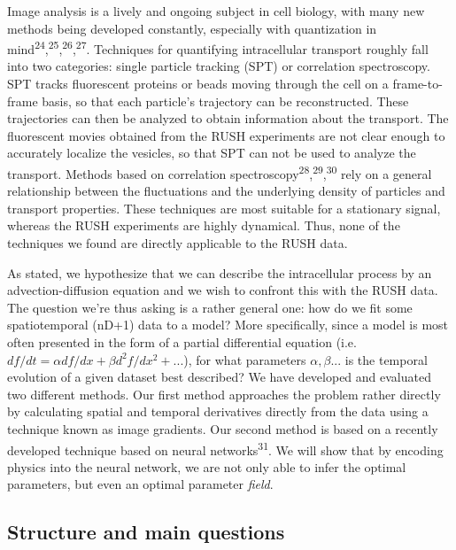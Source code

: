 \documentclass{Dissertate}
\begin{document}
Image analysis is a lively and ongoing subject in cell biology, with
many new methods being developed constantly, especially with
quantization in
mind\textsuperscript{24},\textsuperscript{25},\textsuperscript{26},\textsuperscript{27}.
Techniques for quantifying intracellular transport roughly fall into two
categories: single particle tracking (SPT) or correlation spectroscopy.
SPT tracks fluorescent proteins or beads moving through the cell on a
frame-to-frame basis, so that each particle's trajectory can be
reconstructed. These trajectories can then be analyzed to obtain
information about the transport. The fluorescent movies obtained from
the RUSH experiments are not clear enough to accurately localize the
vesicles, so that SPT can not be used to analyze the transport. Methods
based on correlation
spectroscopy\textsuperscript{28},\textsuperscript{29},\textsuperscript{30}
rely on a general relationship between the fluctuations and the
underlying density of particles and transport properties. These
techniques are most suitable for a stationary signal, whereas the RUSH
experiments are highly dynamical. Thus, none of the techniques we found
are directly applicable to the RUSH data.

As stated, we hypothesize that we can describe the intracellular process
by an advection-diffusion equation and we wish to confront this with the
RUSH data. The question we're thus asking is a rather general one: how
do we fit some spatiotemporal (nD+1) data to a model? More specifically,
since a model is most often presented in the form of a partial
differential equation (i.e.
\(df/dt = \alpha df/dx+\beta d^2f/dx^2+...\)), for what parameters
\(\alpha, \beta...\) is the temporal evolution of a given dataset best
described? We have developed and evaluated two different methods. Our
first method approaches the problem rather directly by calculating
spatial and temporal derivatives directly from the data using a
technique known as image gradients. Our second method is based on a
recently developed technique based on neural
networks\textsuperscript{31}. We will show that by encoding physics into
the neural network, we are not only able to infer the optimal
parameters, but even an optimal parameter \emph{field}.

\hypertarget{structure-and-main-questions}{%
\subsection{Structure and main
questions}\label{structure-and-main-questions}}
\end{document}
